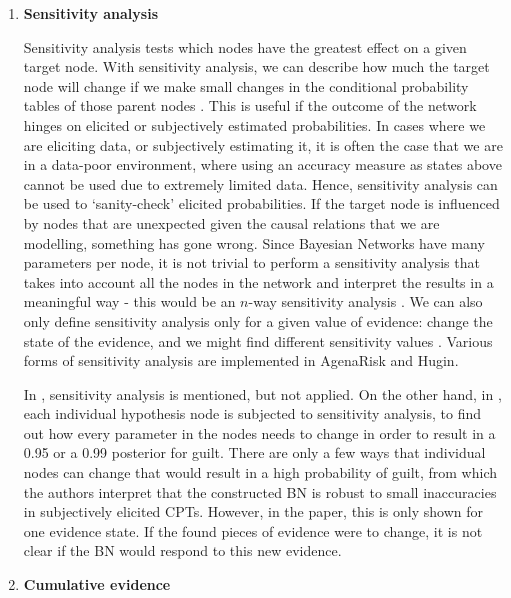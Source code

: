 \documentclass[12pt]{article}
\begin{document}
\begin{enumerate}

\item \textbf{Sensitivity analysis}

Sensitivity analysis tests which nodes have the greatest effect on a given target node. With sensitivity analysis, we can describe how much the target node will change if we make small changes in the conditional probability tables of those parent nodes \citep{fentonNeil2013}. This is useful if the outcome of the network hinges on elicited or subjectively estimated probabilities. In cases where we are eliciting data, or subjectively estimating it, it is often the case that we are in a data-poor environment, where using an accuracy measure as states above cannot be used due to extremely limited data. Hence, sensitivity analysis can be used to `sanity-check' elicited probabilities. If the target node is influenced by nodes that are unexpected given the causal relations that we are modelling, something has gone wrong. Since Bayesian Networks have many parameters per node, it is not trivial to perform a sensitivity analysis that takes into account all the nodes in the network and interpret the results in a meaningful way - this would be an $n$-way sensitivity analysis \citep{gaag2007}. We can also only define sensitivity analysis only for a given value of evidence: change the state of the evidence, and we might find different sensitivity values \citep{fentonNeil2013}. Various forms of sensitivity analysis are implemented in AgenaRisk and Hugin.

In \citet{vlek2016}, sensitivity analysis is mentioned, but not applied. On the other hand, in \citet{Fenton2019}, each individual hypothesis node is subjected to sensitivity analysis, to find out how every parameter in the nodes needs to change in order to result in a 0.95 or a 0.99 posterior for guilt. There are only a few ways that individual nodes can change that would result in a high probability of guilt, from which the authors interpret that the constructed BN is robust to small inaccuracies in subjectively elicited CPTs. However, in the paper, this is only shown for one evidence state. If the found pieces of evidence were to change, it is not clear if the BN would respond to this new evidence. 

\item \textbf{Cumulative evidence}


\end{enumerate}
\end{document}
